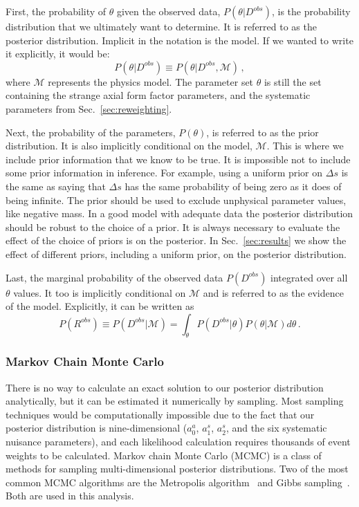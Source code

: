     First, the probability of $\theta$ given the observed data,
    $P(\theta|D^{obs})$, is the probability distribution that we ultimately
    want to determine. It is referred to as the posterior distribution.
    Implicit in the notation is the model. If we wanted to write it explicitly,
    it would be:
    \begin{equation*}
      P(\theta|D^{obs})\equiv P(\theta|D^{obs},\mathcal{M}) \,,
    \end{equation*}
    where $\mathcal{M}$ represents the physics model. The parameter set
    $\theta$ is still the set containing the strange axial form factor
    parameters, and the systematic parameters from Sec.~\ref{sec:reweighting}.

    Next, the probability of the parameters, $P(\theta)$, is referred to as the
    prior distribution. It is also implicitly conditional on the model,
    $\mathcal{M}$. This is where we include prior information that we know to
    be true. It is impossible not to include some prior information in
    inference. For example, using a uniform prior on $\Delta s$ is the same as
    saying that $\Delta s$ has the same probability of being zero as it does of
    being infinite. The prior should be used to exclude unphysical parameter
    values, like negative mass. In a good model with adequate data the
    posterior distribution should be robust to the choice of a prior. It is
    always necessary to evaluate the effect of the choice of priors is on the
    posterior. In Sec.~\ref{sec:results} we show the effect of different
    priors, including a uniform prior, on the posterior distribution.

    Last, the marginal probability of the observed data $P(D^{obs})$ integrated
    over all $\theta$ values.  It too is implicitly conditional on
    $\mathcal{M}$ and is referred to as the evidence of the model. Explicitly,
    it can be written as
    \begin{equation*}
      P(R^{obs}) \equiv P(D^{obs}|\mathcal{M}) 
          = \int_{\theta}P(D^{obs}|\theta)P(\theta|\mathcal{M})d\theta \,.
    \end{equation*}

  \subsubsection{Markov Chain Monte Carlo}
    There is no way to calculate an exact solution to our posterior
    distribution analytically, but it can be estimated it numerically by
    sampling. Most sampling techniques would be computationally impossible due
    to the fact that our posterior distribution is nine-dimensional ($a_0^a$,
    $a_1^s$, $a_2^s$, and the six systematic nuisance parameters), and each
    likelihood calculation requires thousands of event weights to be
    calculated.  Markov chain Monte Carlo (MCMC) is a class of methods for
    sampling multi-dimensional posterior distributions. Two of the most common
    MCMC algorithms are the Metropolis algorithm~\cite{Metropolis:1953am} and
    Gibbs sampling~\cite{Geman:1987}. Both are used in this analysis.

